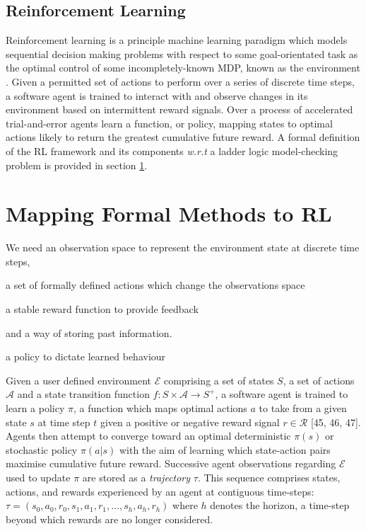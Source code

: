 \documentclass[runningheads]{llncs}
\begin{document}
\subsection{Reinforcement Learning}

Reinforcement learning is a principle machine learning paradigm which models sequential decision making problems with respect to some goal-orientated task as the optimal control of some incompletely-known MDP, known as the environment  \cite{sutton2018reinforcement}. Given a permitted set of actions to perform over a series of discrete time steps, a software agent is trained to interact with and observe changes in its environment based on intermittent reward signals. Over a process of accelerated trial-and-error agents learn a function, or policy, mapping states to optimal actions likely to return the greatest cumulative future reward. A formal definition of the RL framework and its components \textit{w.r.t} a ladder logic model-checking problem is provided in section \ref{sec:mapping_fm_to_ml}. 


\section{Mapping Formal Methods to RL} \label{sec:mapping_fm_to_ml}
We need an observation space to represent the environment state at discrete time steps,

a set of formally defined actions which change the observations space

a stable reward function to provide feedback

and a way of storing past information. 

a policy to dictate learned behaviour


Given a user defined environment $\mathcal{E}$ comprising a set of states $S$, a set of actions $\mathcal{A}$ and a state transition function $f: S \times \mathcal{A} \to S^+$, a software agent is trained to learn a policy $\pi$, a function which maps optimal actions $a$ to take from a given state $s$ at time step $t$ given a positive or negative reward signal $r \in \mathcal{R}$ [45, 46, 47]. Agents then attempt to converge toward an optimal deterministic $\pi(s)$ or stochastic policy $\pi(a|s)$ with the aim of learning which state-action pairs maximise cumulative future reward. Successive agent observations regarding $\mathcal{E}$ used to update $\pi$ are stored as a \textit{trajectory} $\tau$. This sequence comprises states, actions, and rewards experienced by an agent at contiguous time-steps:
\begin{math}
	\tau = (s_0, a_0, r_0, s_1,a_1,r_1,...,s_h,a_h,r_h)
\end{math}
where $h$ denotes the horizon, a time-step beyond which rewards are no longer considered. \\
\end{document}
